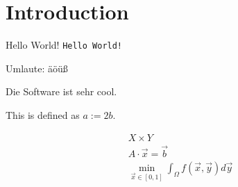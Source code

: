 
\chapter{Introduction}

\cite{zenger91sparse}

Hello World! \texttt{Hello World!}

Umlaute: äöüß

Die Software \sgpp ist sehr cool.

This is defined as $a := 2b$.

\begin{gather}
  X \times Y\\
  A \cdot \vec{x} = \vec{b}\\
  \min_{\vec{x} \in [0, 1]} \int_\Omega f(\vec{x}, \vec{y}) d\vec{y}
\end{gather}

\blindmathpaper
